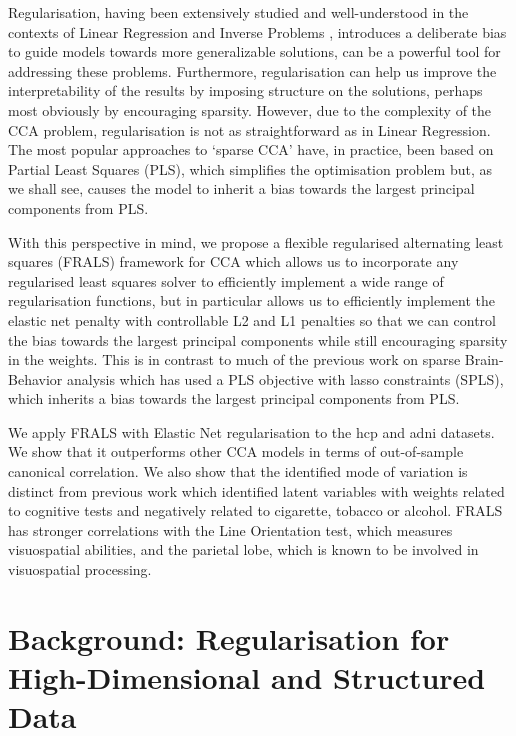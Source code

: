Regularisation, having been extensively studied and well-understood in the contexts of Linear Regression and Inverse Problems \citep{engl1996regularisation}, introduces a deliberate bias to guide models towards more generalizable solutions, can be a powerful tool for addressing these problems.
Furthermore, regularisation can help us improve the interpretability of the results by imposing structure on the solutions, perhaps most obviously by encouraging sparsity\citep{bzdok2019towards}.
However, due to the complexity of the CCA problem, regularisation is not as straightforward as in Linear Regression.
The most popular approaches to `sparse CCA' have, in practice, been based on Partial Least Squares (PLS), which simplifies the optimisation problem but, as we shall see, causes the model to inherit a bias towards the largest principal components from PLS.

With this perspective in mind, we propose a flexible regularised alternating least squares (FRALS) framework for CCA which allows us to incorporate any regularised least squares solver to efficiently implement a wide range of regularisation functions, but in particular allows us to efficiently implement the elastic net penalty with controllable L2 and L1 penalties so that we can control the bias towards the largest principal components while still encouraging sparsity in the weights.
This is in contrast to much of the previous work on sparse Brain-Behavior analysis which has used a PLS objective with lasso constraints (SPLS), which inherits a bias towards the largest principal components from PLS.

We apply FRALS with Elastic Net regularisation to the \acrshort{hcp} and \acrshort{adni} datasets.
We show that it outperforms other CCA models in terms of out-of-sample canonical correlation.
We also show that the identified mode of variation is distinct from previous work which identified latent variables with \gls{weights} related to cognitive tests and negatively related to cigarette, tobacco or alcohol\citep{smith2015positive}.
FRALS has stronger correlations with the Line Orientation test, which measures visuospatial abilities, and the parietal lobe, which is known to be involved in visuospatial processing.


\section{Background: Regularisation for High-Dimensional and Structured Data}\label{sec:background}

